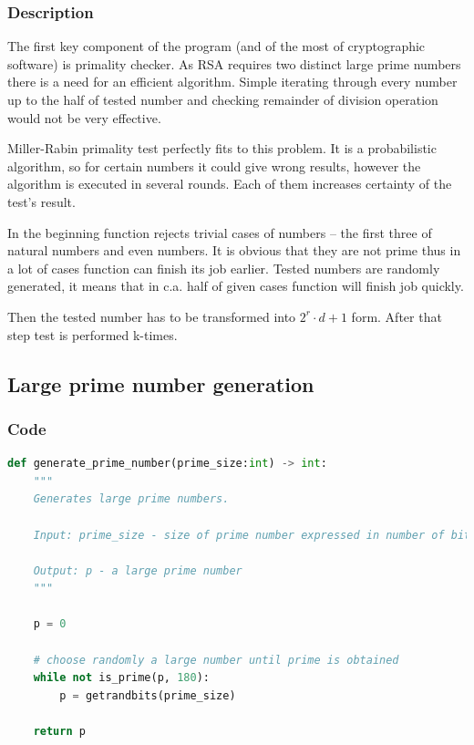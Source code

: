 \documentclass{article}
\begin{document}
\subsubsection{Description}
The first key component of the program (and of the most of cryptographic software) is primality
checker. As RSA requires two distinct large prime numbers there is a need for an efficient algorithm.
Simple iterating through every number up to the half of tested number and checking remainder of
division operation would not be very effective.

Miller-Rabin primality test perfectly fits to this problem. It is a probabilistic algorithm, so
for certain numbers it could give wrong results, however the algorithm is executed in several rounds.
Each of them increases certainty of the test's result.

In the beginning function rejects trivial cases of numbers -- the first three of natural numbers
and even numbers. It is obvious that they are not prime thus in a lot of cases function can finish its
job earlier. Tested numbers are randomly generated, it means that in c.a. half of given cases
function will finish job quickly.

Then the tested number has to be transformed into $2^r \cdot d + 1$ form. After that step
test is performed k-times.

\subsection{Large prime number generation}
\subsubsection{Code}

\small

\begin{lstlisting}[language=Python]
    def generate_prime_number(prime_size:int) -> int:
    """
    Generates large prime numbers.

    Input: prime_size - size of prime number expressed in number of bits

    Output: p - a large prime number
    """

    p = 0

    # choose randomly a large number until prime is obtained
    while not is_prime(p, 180):
        p = getrandbits(prime_size)

    return p
\end{lstlisting}
\end{document}
